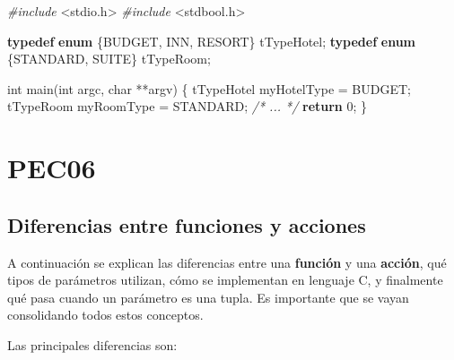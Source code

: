 \documentclass[
]{book}
\newenvironment{Shaded}{\begin{snugshade}}{\end{snugshade}}
\newcommand{\CommentTok}[1]{\textcolor[rgb]{0.56,0.35,0.01}{\textit{#1}}}
\newcommand{\ControlFlowTok}[1]{\textcolor[rgb]{0.13,0.29,0.53}{\textbf{#1}}}
\newcommand{\DataTypeTok}[1]{\textcolor[rgb]{0.13,0.29,0.53}{#1}}
\newcommand{\DecValTok}[1]{\textcolor[rgb]{0.00,0.00,0.81}{#1}}
\newcommand{\ImportTok}[1]{#1}
\newcommand{\KeywordTok}[1]{\textcolor[rgb]{0.13,0.29,0.53}{\textbf{#1}}}
\newcommand{\NormalTok}[1]{#1}
\newcommand{\PreprocessorTok}[1]{\textcolor[rgb]{0.56,0.35,0.01}{\textit{#1}}}
\begin{document}
\begin{Shaded}
\begin{Highlighting}[]
\PreprocessorTok{\#include }\ImportTok{\textless{}stdio.h\textgreater{}}
\PreprocessorTok{\#include }\ImportTok{\textless{}stdbool.h\textgreater{}}

\KeywordTok{typedef} \KeywordTok{enum}\NormalTok{ \{BUDGET, INN, RESORT\} tTypeHotel;}
\KeywordTok{typedef} \KeywordTok{enum}\NormalTok{ \{STANDARD, SUITE\} tTypeRoom;}

\DataTypeTok{int}\NormalTok{ main(}\DataTypeTok{int}\NormalTok{ argc, }\DataTypeTok{char}\NormalTok{ **argv) \{}
\NormalTok{    tTypeHotel myHotelType = BUDGET;}
\NormalTok{    tTypeRoom myRoomType = STANDARD;}
    \CommentTok{/* ... */}
    \ControlFlowTok{return} \DecValTok{0}\NormalTok{;}
\NormalTok{\}}
\end{Highlighting}
\end{Shaded}

\hypertarget{pec06}{%
\chapter{PEC06}\label{pec06}}

\hypertarget{diferencias-entre-funciones-y-acciones}{%
\section{Diferencias entre funciones y acciones}\label{diferencias-entre-funciones-y-acciones}}

A continuación se explican las diferencias entre una \textbf{función} y una \textbf{acción}, qué tipos de parámetros utilizan, cómo se implementan en lenguaje C, y finalmente qué pasa cuando un parámetro es una tupla. Es importante que se vayan consolidando todos estos conceptos.

Las principales diferencias son:
\end{document}
